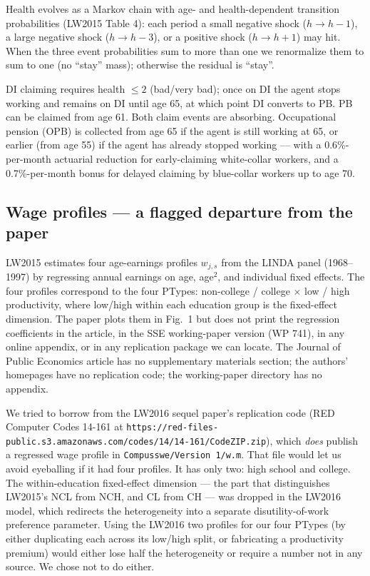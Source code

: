 \documentclass[11pt,fleqn]{article}
\begin{document}
Health evolves as a Markov chain with age- and health-dependent transition probabilities (LW2015 Table 4): each period a small negative shock ($h\to h-1$), a large negative shock ($h\to h-3$), or a positive shock ($h\to h+1$) may hit. When the three event probabilities sum to more than one we renormalize them to sum to one (no ``stay'' mass); otherwise the residual is ``stay''.

DI claiming requires health $\le 2$ (bad/very bad); once on DI the agent stops working and remains on DI until age 65, at which point DI converts to PB. PB can be claimed from age 61. Both claim events are absorbing. Occupational pension (OPB) is collected from age 65 if the agent is still working at 65, or earlier (from age 55) if the agent has already stopped working --- with a 0.6\%-per-month actuarial reduction for early-claiming white-collar workers, and a 0.7\%-per-month bonus for delayed claiming by blue-collar workers up to age 70.

\subsection*{Wage profiles --- a flagged departure from the paper}\label{sec:wage-profiles}
LW2015 estimates four age-earnings profiles $w_{j,s}$ from the LINDA panel (1968--1997) by regressing annual earnings on age, age$^2$, and individual fixed effects. The four profiles correspond to the four PTypes: non-college / college $\times$ low / high productivity, where low/high within each education group is the fixed-effect dimension. The paper plots them in Fig.~1 but does not print the regression coefficients in the article, in the SSE working-paper version (WP 741), in any online appendix, or in any replication package we can locate. The Journal of Public Economics article has no supplementary materials section; the authors' homepages have no replication code; the working-paper directory has no appendix.

We tried to borrow from the LW2016 sequel paper's replication code (RED Computer Codes 14-161 at \texttt{https://red-files-public.s3.amazonaws.com/codes/14/14-161/CodeZIP.zip}), which \emph{does} publish a regressed wage profile in \texttt{Compusswe/Version~1/w.m}. That file would let us avoid eyeballing if it had four profiles. It has only two: high school and college. The within-education fixed-effect dimension --- the part that distinguishes LW2015's NCL from NCH, and CL from CH --- was dropped in the LW2016 model, which redirects the heterogeneity into a separate disutility-of-work preference parameter. Using the LW2016 two profiles for our four PTypes (by either duplicating each across its low/high split, or fabricating a productivity premium) would either lose half the heterogeneity or require a number not in any source. We chose not to do either.
\end{document}
